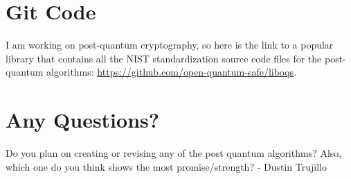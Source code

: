 \section{Git Code}
I am working on post-quantum cryptography, so here is the link to a popular library that contains all the NIST standardization source code files for the post-quantum algorithms:
\href{https://github.com/open-quantum-safe/liboqs}{https://github.com/open-quantum-safe/liboqs}.

\section{Any Questions?}

Do you plan on creating or revising any of the post quantum algorithms? Also, which one do you think shows the most promise/strength? - Dustin Trujillo 
%
%
